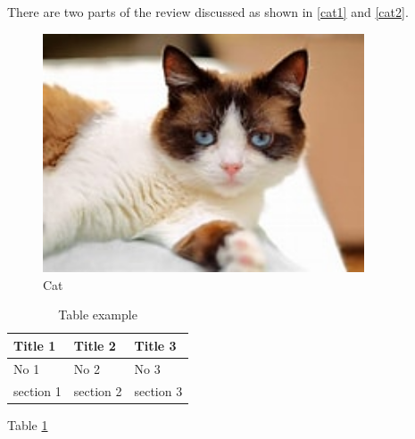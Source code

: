 There are two parts of the review discussed as shown in \figurename{\ref{cat1}} and \figurename{\ref{cat2}}. 

\begin{figure}[H]
	\centering
	\includegraphics[width=0.85\textwidth]{files/imgs/cat}
	\caption{Cat}
	\label{cat3}
\end{figure}

\begin{table}[H]
	\centering
	\begin{tabular}{|l|l|l|}
		\hline
		Title 1   & Title 2   & Title 3   \\ \hline
		No 1      & No 2      & No 3      \\ \hline
		section 1 & section 2 & section 3 \\ \hline
	\end{tabular}
	\caption{Table example}
    \label{table}
\end{table}

Table \ref{table}

